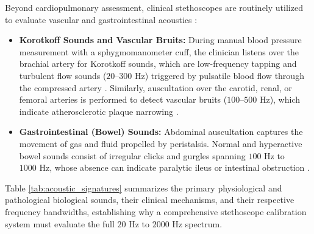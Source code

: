 Beyond cardiopulmonary assessment, clinical stethoscopes are routinely utilized to evaluate vascular and gastrointestinal acoustics \cite{leng2015electronic, webster2010medical}:
\begin{itemize}
    \item \textbf{Korotkoff Sounds and Vascular Bruits:} During manual blood pressure measurement with a sphygmomanometer cuff, the clinician listens over the brachial artery for Korotkoff sounds, which are low-frequency tapping and turbulent flow sounds ($20\text{--}300\text{ Hz}$) triggered by pulsatile blood flow through the compressed artery \cite{webster2010medical}. Similarly, auscultation over the carotid, renal, or femoral arteries is performed to detect vascular bruits ($100\text{--}500\text{ Hz}$), which indicate atherosclerotic plaque narrowing \cite{leng2015electronic}.
    \item \textbf{Gastrointestinal (Bowel) Sounds:} Abdominal auscultation captures the movement of gas and fluid propelled by peristalsis. Normal and hyperactive bowel sounds consist of irregular clicks and gurgles spanning $100\text{ Hz}$ to $1000\text{ Hz}$, whose absence can indicate paralytic ileus or intestinal obstruction \cite{leng2015electronic}.
\end{itemize}

Table \ref{tab:acoustic_signatures} summarizes the primary physiological and pathological biological sounds, their clinical mechanisms, and their respective frequency bandwidths, establishing why a comprehensive stethoscope calibration system must evaluate the full $20\text{ Hz}$ to $2000\text{ Hz}$ spectrum.

